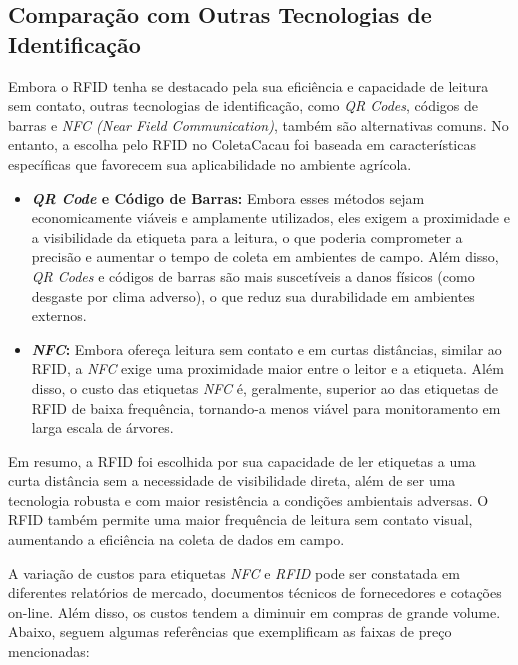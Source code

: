 \subsection{Comparação com Outras Tecnologias de Identificação}
Embora o RFID tenha se destacado pela sua eficiência e capacidade de leitura sem contato, outras tecnologias de identificação, como \textit{QR Codes}, códigos de barras e \textit{NFC (Near Field Communication)}, também são alternativas comuns. No entanto, a escolha pelo RFID no ColetaCacau foi baseada em características específicas que favorecem sua aplicabilidade no ambiente agrícola.

\begin{itemize}
    \item \textbf{\textit{QR Code} e Código de Barras:} Embora esses métodos sejam economicamente viáveis e amplamente utilizados, eles exigem a proximidade e a visibilidade da etiqueta para a leitura, o que poderia comprometer a precisão e aumentar o tempo de coleta em ambientes de campo. Além disso, \textit{QR Codes} e códigos de barras são mais suscetíveis a danos físicos (como desgaste por clima adverso), o que reduz sua durabilidade em ambientes externos. \cite{Khosravi2018ComparisonBN}

    \item \textbf{\textit{NFC}:} Embora ofereça leitura sem contato e em curtas distâncias, similar ao RFID, a \textit{NFC} exige uma proximidade maior entre o leitor e a etiqueta. Além disso, o custo das etiquetas \textit{NFC} é, geralmente, superior ao das etiquetas de RFID de baixa frequência, tornando-a menos viável para monitoramento em larga escala de árvores. \cite{Khosravi2018ComparisonBN}
\end{itemize}

Em resumo, a RFID foi escolhida por sua capacidade de ler etiquetas a uma curta distância sem a necessidade de visibilidade direta, além de ser uma tecnologia robusta e com maior resistência a condições ambientais adversas. O RFID também permite uma maior frequência de leitura sem contato visual, aumentando a eficiência na coleta de dados em campo.

A variação de custos para etiquetas \textit{NFC} e \textit{RFID} pode ser constatada em diferentes relatórios de mercado, documentos técnicos de fornecedores e cotações on-line. Além disso, os custos tendem a diminuir em compras de grande volume. Abaixo, seguem algumas referências que exemplificam as faixas de preço mencionadas:

